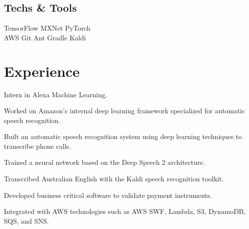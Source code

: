 \documentclass[]{deedy-resume}
\begin{document}
\begin{minipage}[t]{0.33\textwidth}
\subsection{Techs \& Tools}
TensorFlow \textbullet{} MXNet \textbullet{} PyTorch\\
AWS \textbullet{} Git \textbullet{} Ant \textbullet{} Gradle \textbullet{} Kaldi

%
%

\end{minipage} 
\hfill
\begin{minipage}[t]{0.66\textwidth} 


\section{Experience}
\begin{tightemize}
\vspace{\topsep} %
    \item Intern in Alexa Machine Learning.
    \item Worked on Amazon's internal deep learning framework specialized for automatic
    speech recognition.
\end{tightemize}
\sectionsep

\begin{tightemize}
  \item Built an automatic speech recognition system using deep learning techniques to transcribe phone calls.
  \item Trained a neural network based on the Deep Speech 2 architecture.
  \item Transcribed Australian English with the Kaldi speech recognition toolkit.
\end{tightemize}
\sectionsep

\begin{tightemize}
  \item Developed business critical software to validate payment instruments.
  \item Integrated with AWS technologies such as AWS SWF, Lambda, S3, DynamoDB, SQS, and SNS.
\end{tightemize}
\sectionsep


\end{minipage}
\end{document}

